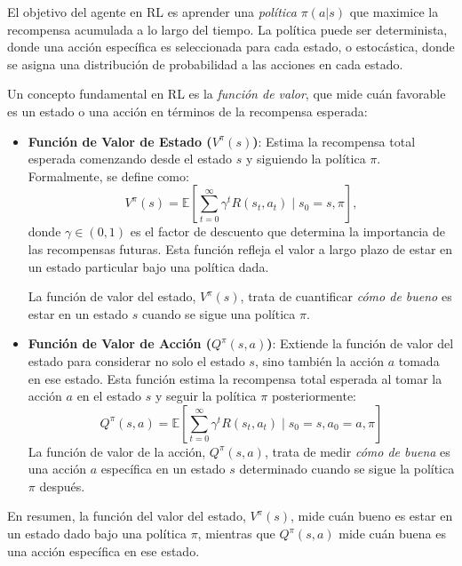 \documentclass[a4paper,12pt, twoside]{report}
\begin{document}
El objetivo del agente en RL es aprender una \textit{política} \(\pi(a|s)\) que maximice la recompensa 
acumulada a lo largo del tiempo. La política puede ser determinista, donde una acción específica es 
seleccionada para cada estado, o estocástica, donde se asigna una distribución de probabilidad a las
acciones en cada estado.

Un concepto fundamental en RL es la \textit{función de valor}, que mide cuán favorable es un estado 
o una acción en términos de la recompensa esperada:

\begin{itemize}
    \item \textbf{Función de Valor de Estado (\(V^{\pi}(s)\))}: Estima la recompensa total esperada 
    comenzando desde el estado \(s\) y siguiendo la política \(\pi\). Formalmente, se define como:
    \begin{equation}
    V^{\pi}(s) = \mathbb{E}\left[\sum_{t=0}^{\infty} \gamma^t R(s_t, a_t) \mid s_0 = s, \pi\right],
    \end{equation}
    donde \(\gamma \in (0, 1)\) es el factor de descuento que determina la importancia de las 
    recompensas futuras. Esta función refleja el valor a largo plazo de estar en un estado particular 
    bajo una política dada.

    La función de valor del estado, \(V^{\pi}(s)\), trata de cuantificar \textit{cómo de bueno} es 
    estar en un estado \(s\) cuando se sigue una política \(\pi\).

    \item \textbf{Función de Valor de Acción (\(Q^{\pi}(s, a)\))}: Extiende la función de valor del 
    estado para considerar no solo el estado \(s\), sino también la acción \(a\) tomada en ese estado. 
    Esta función estima la recompensa total esperada al tomar la acción \(a\) en el estado \(s\) y 
    seguir la política \(\pi\) posteriormente:
    \begin{equation}
    Q^{\pi}(s, a) = \mathbb{E}\left[\sum_{t=0}^{\infty} \gamma^t R(s_t, a_t) \mid s_0 = s, a_0 = a, \pi\right]
    \end{equation}
    La función de valor de la acción, \(Q^{\pi}(s, a)\), trata de medir \textit{cómo de buena} es una 
    acción \(a\) específica en un estado \(s\) determinado cuando se sigue la política \(\pi\) después.
 
\end{itemize}

En resumen, la función del valor del estado, \(V^{\pi}(s)\), mide cuán bueno es estar en un estado dado 
bajo una política \(\pi\), mientras que \(Q^{\pi}(s, a)\) mide cuán buena es una acción específica en 
ese estado.
\end{document}

